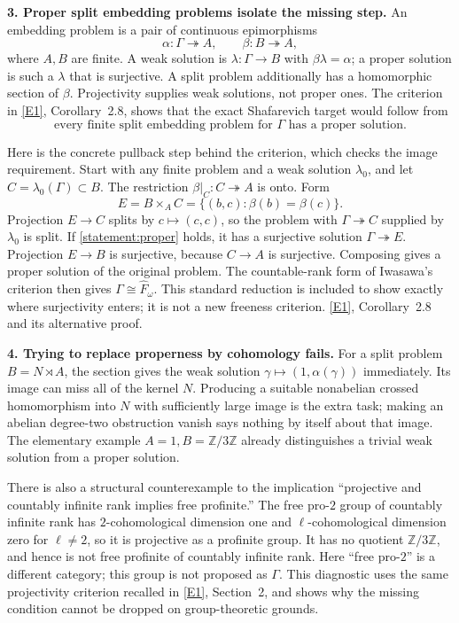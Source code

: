 \documentclass[11pt,a4paper]{article}
\newcommand{\Z}{\mathbb{Z}}
\newcommand{\eref}[2]{\hyperlink{extra:#1:#2}{[E#2]}}
\numberwithin{equation}{section}
\begin{document}
\textbf{3. Proper split embedding problems isolate the missing step.}
An embedding problem is a pair of continuous epimorphisms
\[
 \alpha:\Gamma\twoheadrightarrow A,\qquad
 \beta:B\twoheadrightarrow A,
\]
where $A,B$ are finite. A weak solution is $\lambda:\Gamma\to B$ with
$\beta\lambda=\alpha$; a proper solution is such a $\lambda$ that is
surjective. A split problem additionally has a homomorphic section of
$\beta$. Projectivity supplies weak solutions, not proper ones.
The criterion in \eref{statement}{1}, Corollary~2.8, shows that the exact
Shafarevich target would follow from
\begin{equation}\label{statement:proper}
 \text{every finite split embedding problem for }\Gamma
           \text{ has a proper solution.}
\end{equation}

Here is the concrete pullback step behind the criterion, which checks the
image requirement. Start with any finite problem and a weak solution
$\lambda_0$, and let $C=\lambda_0(\Gamma)\subset B$.
The restriction $\beta|_C:C\twoheadrightarrow A$ is onto. Form
\[
 E=B\times_A C=\{(b,c):\beta(b)=\beta(c)\}.
\]
Projection $E\to C$ splits by $c\mapsto(c,c)$, so the problem with
$\Gamma\twoheadrightarrow C$ supplied by $\lambda_0$ is split.
If \eqref{statement:proper} holds, it has a surjective solution
$\Gamma\twoheadrightarrow E$. Projection $E\to B$ is surjective,
because $C\to A$ is surjective. Composing gives a proper solution of
the original problem. The countable-rank form of Iwasawa's criterion
then gives $\Gamma\cong\widehat F_\omega$.
This standard reduction is included to show exactly where surjectivity
enters; it is not a new freeness criterion. \eref{statement}{1},
Corollary~2.8 and its alternative proof.

\textbf{4. Trying to replace properness by cohomology fails.}
For a split problem $B=N\rtimes A$, the section gives the weak solution
$\gamma\mapsto(1,\alpha(\gamma))$ immediately. Its image can miss all
of the kernel $N$. Producing a suitable nonabelian crossed homomorphism
into $N$ with sufficiently large image is the extra task; making an
abelian degree-two obstruction vanish says nothing by itself about that
image. The elementary example $A=1,B=\Z/3\Z$ already distinguishes a
trivial weak solution from a proper solution.

There is also a structural counterexample to the implication
``projective and countably infinite rank implies free profinite.''
The free pro-$2$ group of countably infinite rank has $2$-cohomological
dimension one and $\ell$-cohomological dimension zero for $\ell\ne2$,
so it is projective as a profinite group. It has no quotient $\Z/3\Z$,
and hence is not free profinite of countably infinite rank. Here
``free pro-$2$'' is a different category; this group is not proposed as
$\Gamma$. This diagnostic uses the same projectivity criterion recalled
in \eref{statement}{1}, Section~2, and shows why the missing condition cannot
be dropped on group-theoretic grounds.
\end{document}
